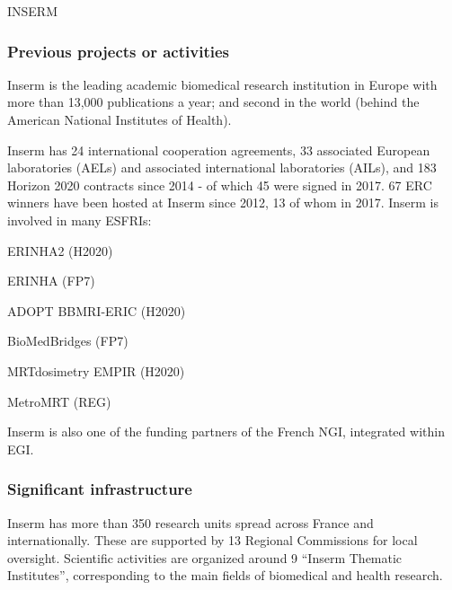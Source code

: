 \begin{sitedescription}{INSERM}
\subsubsection*{Previous projects or activities}
Inserm is the leading academic biomedical research institution in Europe with
more than 13,000 publications a year; and second in the world (behind the
American National Institutes of Health).

Inserm has 24 international cooperation agreements, 33 associated European
laboratories (AELs) and associated international laboratories (AILs), and 183
Horizon 2020 contracts since 2014 - of which 45 were signed in 2017. 67 ERC
winners have been hosted at Inserm since 2012, 13 of whom in 2017.  Inserm is
involved in many ESFRIs:
\begin{compactenum}
\item ERINHA2 (H2020)
\item ERINHA (FP7)
\item ADOPT BBMRI-ERIC (H2020)
\item BioMedBridges (FP7)
\item MRTdosimetry EMPIR (H2020)
\item MetroMRT (REG)
\end{compactenum}
Inserm is also one of the funding partners of the French NGI, integrated within
EGI.

\subsubsection*{Significant infrastructure}
Inserm has more than 350 research units spread across France and
internationally. These are supported by 13 Regional Commissions for local
oversight. Scientific activities are organized around 9 “Inserm Thematic
Institutes”, corresponding to the main fields of biomedical and health
research.

\end{sitedescription}
